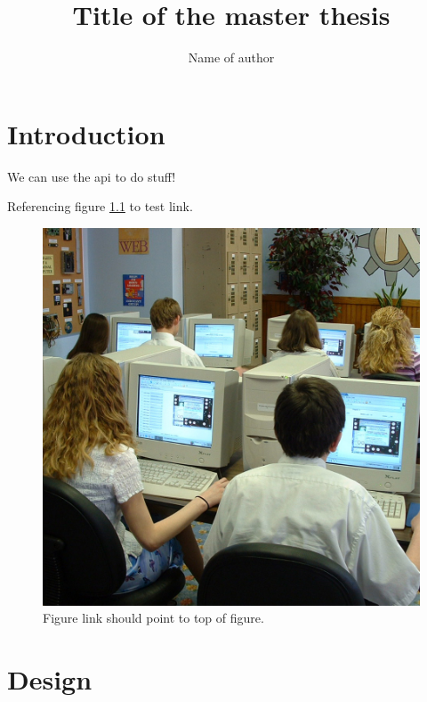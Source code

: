 \documentclass[final,10pt]{../../uit-thesis}
\begin{document}

\title{Title of the master thesis}
\author{Name of author}


\maketitle

\frontmatter

\tableofcontents


\printglossaries
{}

\mainmatter

\chapter{Introduction}
\lipsum[1]
\lipsum[1]
\lipsum[1-7]

We can use the \ac{api} to do stuff!

Referencing figure \ref{fig:ex} to test link.

\begin{figure}\label{fig:ex}
\centering
\includegraphics[scale=0.1]{748443511_095ae916df_o.jpg}
\caption{Figure link should point to top of figure.}
\end{figure}

\chapter{Design}
\lipsum[8-10]

\backmatter
\end{document}
